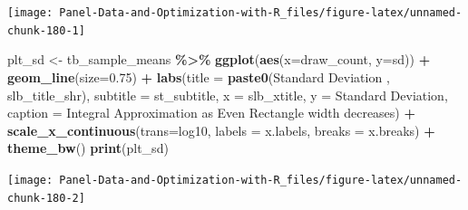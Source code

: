\documentclass[
]{book}
\newenvironment{Shaded}{\begin{snugshade}}{\end{snugshade}}
\newcommand{\DataTypeTok}[1]{\textcolor[rgb]{0.13,0.29,0.53}{#1}}
\newcommand{\FloatTok}[1]{\textcolor[rgb]{0.00,0.00,0.81}{#1}}
\newcommand{\KeywordTok}[1]{\textcolor[rgb]{0.13,0.29,0.53}{\textbf{#1}}}
\newcommand{\NormalTok}[1]{#1}
\newcommand{\OperatorTok}[1]{\textcolor[rgb]{0.81,0.36,0.00}{\textbf{#1}}}
\newcommand{\StringTok}[1]{\textcolor[rgb]{0.31,0.60,0.02}{#1}}
\begin{document}
\begin{center}\texttt{[image: Panel-Data-and-Optimization-with-R\_files/figure-latex/unnamed-chunk-180-1]} \end{center}

\begin{Shaded}
\begin{Highlighting}[]
\NormalTok{plt\_sd \textless{}{-}}\StringTok{ }\NormalTok{tb\_sample\_means }\OperatorTok{\%\textgreater{}\%}
\StringTok{  }\KeywordTok{ggplot}\NormalTok{(}\KeywordTok{aes}\NormalTok{(}\DataTypeTok{x=}\NormalTok{draw\_count, }\DataTypeTok{y=}\NormalTok{sd)) }\OperatorTok{+}
\StringTok{  }\KeywordTok{geom\_line}\NormalTok{(}\DataTypeTok{size=}\FloatTok{0.75}\NormalTok{) }\OperatorTok{+}
\StringTok{  }\KeywordTok{labs}\NormalTok{(}\DataTypeTok{title =} \KeywordTok{paste0}\NormalTok{(}\StringTok{\textquotesingle{}Standard Deviation \textquotesingle{}}\NormalTok{, slb\_title\_shr),}
       \DataTypeTok{subtitle =}\NormalTok{ st\_subtitle,}
       \DataTypeTok{x =}\NormalTok{ slb\_xtitle,}
       \DataTypeTok{y =} \StringTok{\textquotesingle{}Standard Deviation\textquotesingle{}}\NormalTok{,}
       \DataTypeTok{caption =} \StringTok{\textquotesingle{}Integral Approximation as Even Rectangle width decreases\textquotesingle{}}\NormalTok{) }\OperatorTok{+}
\StringTok{  }\KeywordTok{scale\_x\_continuous}\NormalTok{(}\DataTypeTok{trans=}\StringTok{\textquotesingle{}log10\textquotesingle{}}\NormalTok{, }\DataTypeTok{labels =}\NormalTok{ x.labels, }\DataTypeTok{breaks =}\NormalTok{ x.breaks) }\OperatorTok{+}
\StringTok{  }\KeywordTok{theme\_bw}\NormalTok{()}
\KeywordTok{print}\NormalTok{(plt\_sd)}
\end{Highlighting}
\end{Shaded}

\begin{center}\texttt{[image: Panel-Data-and-Optimization-with-R\_files/figure-latex/unnamed-chunk-180-2]} \end{center}
\end{document}

